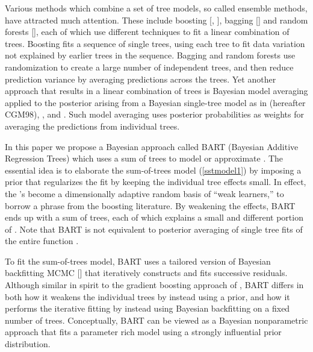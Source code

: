 \documentclass[aoas,nameyear,dvips]{arximspdf}
\newcommand{\citeasnoun}[1]{\citet{#1}}
\begin{document}
Various methods which combine a set of tree models, so called
ensemble methods, have attracted much attention. These include
boosting [\citeasnoun{FreSch1997}, \citeasnoun{Fri2001}], bagging [\citet{Br96a}] and random
forests [\citet{Bre2001}], each of which use
different techniques to fit a linear combination of trees. Boosting
fits a sequence of single trees, using each tree to fit data
variation not explained by earlier trees in the sequence. Bagging
and random forests use randomization to
create a large number of independent trees, and then reduce
prediction variance by averaging predictions across the trees. Yet
another approach that results in a linear combination of trees is
Bayesian model averaging applied to the posterior arising from a
Bayesian single-tree model as in \citeasnoun{ChipGeorMcCu1998a}
(hereafter CGM98), \citeasnoun{DeniMallSmit1998}, \citeasnoun{Blan2004} and
\citeasnoun{WuTjeWes2007}.  Such model averaging uses posterior
probabilities as weights for averaging the predictions from
individual trees.


In this paper we propose a Bayesian approach called BART (Bayesian
Additive Regression Trees) which uses a sum of trees to model or
approximate  . The
essential idea is to elaborate the sum-of-trees model
(\ref{sstmodel1}) by imposing a prior that regularizes the fit
by keeping the individual tree effects small.  In effect, the 's become
a dimensionally adaptive random basis of ``weak learners,'' to
borrow a phrase from the boosting literature.  By weakening the  effects,
BART ends up with a sum of trees, each of which explains a small and
different portion of .  Note that BART is not equivalent to posterior averaging
of single tree fits of the entire function .

To fit the sum-of-trees model, BART uses a tailored version of
Bayesian backfitting MCMC [\citet{HastTibs2000}] that
iteratively constructs and fits successive residuals. Although
similar in spirit to the gradient boosting approach of
\citeasnoun{Fri2001}, BART differs in both how it weakens the
individual trees by instead using a prior, and how it performs the
iterative fitting by instead using Bayesian backfitting on a fixed
number of trees.  Conceptually, BART can be viewed as a Bayesian
nonparametric approach that fits a parameter rich model using
a strongly influential prior distribution.
\end{document}
